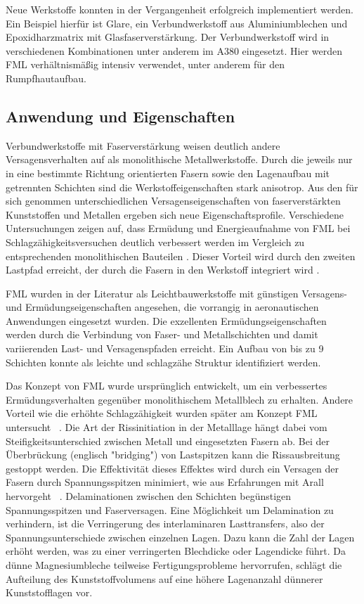 Neue Werkstoffe konnten in der Vergangenheit erfolgreich implementiert werden.
Ein Beispiel hierfür ist Glare, ein Verbundwerkstoff aus Aluminiumblechen und Epoxidharzmatrix mit Glasfaserverstärkung.
Der Verbundwerkstoff wird in verschiedenen Kombinationen unter anderem im A380 eingesetzt.
Hier werden FML verhältnismäßig intensiv verwendet, unter anderem für den Rumpfhautaufbau.~\cite{Airbus.05.04.2021, Vlot.2001}


 

\subsection{Anwendung und Eigenschaften}\label{sec:Anwendung}

Verbundwerkstoffe mit Faserverstärkung weisen deutlich andere Versagensverhalten auf als monolithische Metallwerkstoffe.
Durch die jeweils nur in eine bestimmte Richtung orientierten Fasern sowie den Lagenaufbau mit getrennten Schichten sind die Werkstoffeigenschaften stark anisotrop.
Aus den für sich genommen unterschiedlichen Versagenseigenschaften von faserverstärkten Kunststoffen und Metallen ergeben sich neue Eigenschaftsprofile.
Verschiedene Untersuchungen zeigen auf, dass Ermüdung und Energieaufnahme von FML bei Schlagzähigkeitsversuchen deutlich verbessert werden im Vergleich zu entsprechenden monolithischen Bauteilen \cite{Cortes.2005,Botelho.2006}.
Dieser Vorteil wird durch den zweiten Lastpfad erreicht, der durch die Fasern in den Werkstoff integriert wird \cite{Beumler.2004}.

FML wurden in der Literatur als Leichtbauwerkstoffe mit günstigen Versagens- und Ermüdungseigenschaften angesehen, die vorrangig in aeronautischen Anwendungen eingesetzt wurden.
Die exzellenten Ermüdungseigenschaften werden durch die Verbindung von Faser- und Metallschichten und damit variierenden Last- und Versagenspfaden erreicht.
Ein Aufbau von bis zu 9 Schichten konnte als leichte und schlagzähe Struktur identifiziert werden. \cite{Parnanen.2012}

Das Konzept von FML wurde ursprünglich entwickelt, um ein verbessertes Ermüdungsverhalten gegenüber monolithischem Metallblech zu erhalten.
Andere Vorteil wie die erhöhte Schlagzähigkeit wurden später am Konzept FML untersucht \cite{Alderliesten.2008}~.
Die Art der Rissinitiation in der Metalllage hängt dabei vom Steifigkeitsunterschied zwischen Metall und eingesetzten Fasern ab.
Bei der Überbrückung (englisch "bridging") von Lastspitzen kann die Rissausbreitung gestoppt werden.
Die Effektivität dieses Effektes wird durch ein Versagen der Fasern durch Spannungsspitzen minimiert, wie aus Erfahrungen mit Arall hervorgeht \cite{Marissen.1988}~.
Delaminationen zwischen den Schichten begünstigen Spannungsspitzen und Faserversagen.
Eine Möglichkeit um Delamination zu verhindern, ist die Verringerung des interlaminaren Lasttransfers, also der Spannungsunterschiede zwischen einzelnen Lagen.
Dazu kann die Zahl der Lagen erhöht werden, was zu einer verringerten Blechdicke oder Lagendicke führt.
Da dünne Magnesiumbleche teilweise Fertigungsprobleme hervorrufen, schlägt \cite{Alderliesten.2008} die Aufteilung des Kunststoffvolumens auf eine höhere Lagenanzahl dünnerer Kunststofflagen vor.

